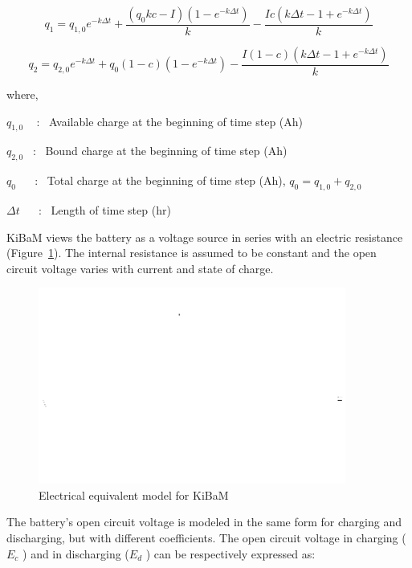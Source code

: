\begin{equation}
{q_1} = {q_{1,0}}{e^{ - k\Delta t}} + \frac{{({q_0}kc - I)(1 - {e^{ - k\Delta t}})}}{k} - \frac{{Ic(k\Delta t - 1 + {e^{ - k\Delta t}})}}{k}
\end{equation}

\begin{equation}
{q_2} = {q_{2,0}}{e^{ - k\Delta t}} + {q_0}(1 - c)(1 - {e^{ - k\Delta t}}) - \frac{{I(1 - c)(k\Delta t - 1 + {e^{ - k\Delta t}})}}{k}
\end{equation}

where,

\({q_{1,0}}\) ~ :~ Available charge at the beginning of time step (Ah)

\({q_{2,0}}\) ~:~ Bound charge at the beginning of time step (Ah)

\({q_0}\) ~~ :~ Total charge at the beginning of time step (Ah), \({q_0} = {q_{1,0}} + {q_{2,0}}\)

\(\Delta t\) ~~ :~ Length of time step (hr)

KiBaM views the battery as a voltage source in series with an electric resistance (Figure~\ref{fig:electrical-equivalent-model-for-kibam}). The internal resistance is assumed to be constant and the open circuit voltage varies with current and state of charge.

\begin{figure}[hbtp] %
\centering
\includegraphics[width=0.9\textwidth, height=0.9\textheight, keepaspectratio=true]{media/image7528.svg.png}
\caption{Electrical equivalent model for KiBaM \protect \label{fig:electrical-equivalent-model-for-kibam}}
\end{figure}

The battery's open circuit voltage is modeled in the same form for charging and discharging, but with different coefficients. The open circuit voltage in charging (\({E_c}\) ) and in discharging (\({E_d}\) ) can be respectively expressed as:

